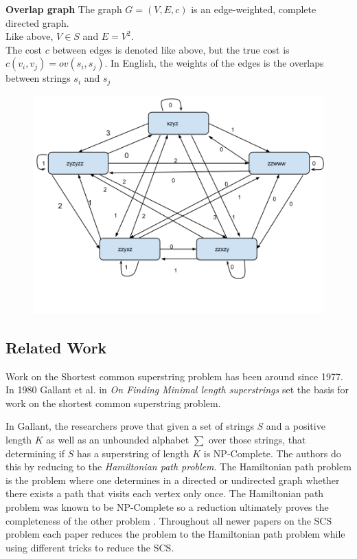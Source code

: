 \documentclass[letterpaper,11pt,titlepage]{article}
\begin{document}
\textbf{Overlap graph}
The graph $G = (V,E,c)$ is an edge-weighted, complete directed graph. \\
Like above, $V \in S$ and $E=V^2$.\\
The cost $c$ between edges is denoted like above, but the true cost is $c(v_i,v_j) = ov(s_i,s_j)$. In English, the weights of the edges is the overlaps between strings $s_i$ and $s_j$\\

\begin{figure}[h]
 \centering
   \includegraphics[width=.4\textwidth]{overlap.png}
\end{figure}

\subsection{Related Work}
Work on the Shortest common superstring problem has been around since 1977. In 1980 Gallant et al. in \textit{On Finding Minimal length superstrings}\cite{gallant1980finding} set the basis for work on the shortest common superstring problem. 

In Gallant, the researchers prove that given a set of strings $S$ and a positive length $K$ as well as an unbounded alphabet $\sum$ over those strings, that determining if $S$ has a superstring of length $K$ is NP-Complete. The authors do this by reducing to the \textit{Hamiltonian  path problem}. The Hamiltonian path problem is the problem where one determines in a directed or undirected graph whether there exists a path that visits each vertex only once. The Hamiltonian path problem was known to be NP-Complete so a reduction ultimately proves the completeness of the other problem \cite{michael1979computers}. Throughout all newer papers on the SCS problem each paper reduces the problem to the Hamiltonian path problem while using different tricks to reduce the SCS.\\
\end{document}

